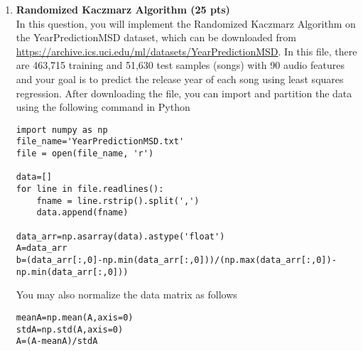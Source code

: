 \begin{enumerate}
\newpage
\item \textbf{Randomized Kaczmarz Algorithm (25 pts)\\} 
In this question, you will implement the Randomized Kaczmarz Algorithm  on the YearPredictionMSD dataset, which can be downloaded from \url{https://archive.ics.uci.edu/ml/datasets/YearPredictionMSD}. In this file, there are 463,715 training and 51,630 test samples (songs) with 90 audio features and your goal is to predict the release year of each song using least squares regression. After downloading the file, you can import and partition the data using the following command in Python
\begin{verbatim}
import numpy as np
file_name='YearPredictionMSD.txt'
file = open(file_name, 'r')

data=[]
for line in file.readlines():
    fname = line.rstrip().split(',')
    data.append(fname)
    
data_arr=np.asarray(data).astype('float')
A=data_arr
b=(data_arr[:,0]-np.min(data_arr[:,0]))/(np.max(data_arr[:,0])-np.min(data_arr[:,0]))
\end{verbatim}
You may also normalize the data matrix as follows
\begin{verbatim}
meanA=np.mean(A,axis=0)
stdA=np.std(A,axis=0)
A=(A-meanA)/stdA
\end{verbatim}


\end{enumerate}

